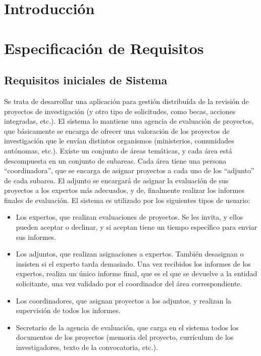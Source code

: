 \documentclass[12pt,a4paper,spanish,twoside]{article}
\begin{document}
\tableofcontents
\newpage
\section{Introducción}

\section{Especificación de Requisitos}
\subsection{Requisitos iniciales de Sistema}
Se trata de desarrollar una aplicación para gestión distribuída de la revisión de proyectos
de investigación (y otro tipo de solicitudes, como becas, acciones integradas, etc.). El
sistema lo mantiene una agencia de evaluación de proyectos, que básicamente se
encarga de ofrecer una valoración de los proyectos de investigación que le envían
distintos organismos (ministerios, comunidades autónomas, etc.). Existe un conjunto de
áreas temáticas, y cada área está descompuesta en un conjunto de subareas. Cada área
tiene una persona ``coordinadora'', que se encarga de asignar proyectos a cada uno de los
``adjunto'' de cada subarea. El adjunto se encargará de asignar la evaluación de sus
proyectos a los expertos más adecuados, y de, finalmente realizar los informes finales
de evaluación. El sistema es utilizado por los siguientes tipos de usuario:

\begin{itemize}
\item Los expertos, que realizan evaluaciones de proyectos. Se les invita, y ellos pueden
aceptar o declinar, y si aceptan tiene un tiempo específico para enviar sus informes.
\item Los adjuntos, que realizan asignaciones a expertos. También desasignan o insisten si el
experto tarda demasiado. Una vez recibidos los informes de los expertos, realiza un
único informe final, que es el que se devuelve a la entidad solicitante, una vez validado
por el coordinador del área correspondiente.
\item Los coordinadores, que asignan proyectos a los adjuntos, y realizan la supervisión de
todos los informes.
\item Secretario de la agencia de evaluación, que carga en el sistema todos los
documentos de los proyectos (memoria del proyecto, currículum de los
investigadores, texto de la convocatoria, etc.).
\end{itemize}
\end{document}
